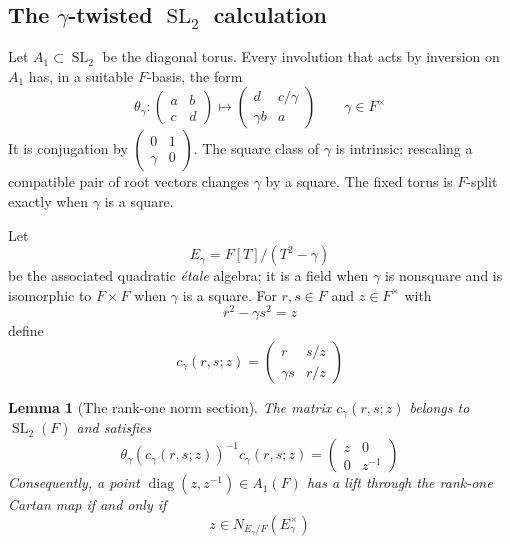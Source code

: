 \documentclass[11pt]{amsart}
\newtheorem{lemma}[lemma]{Lemma}
\theoremstyle{definition}
\theoremstyle{remark}
\newcommand{\diag}{\operatorname{diag}}
\newcommand{\SL}{\operatorname{SL}}
\begin{document}
\subsection{\texorpdfstring{The $\gamma$-twisted $\SL_2$ calculation}{The gamma-twisted SL2 calculation}}
Let $A_1\subset\SL_2$ be the diagonal torus.  Every involution that acts by
inversion on $A_1$ has, in a suitable $F$-basis, the form
\begin{equation}\label{eq:sl2-involution-gamma}
 \theta_\gamma:
 \begin{pmatrix}a&b\\c&d\end{pmatrix}
 \longmapsto
 \begin{pmatrix}d&c/\gamma\\ \gamma b&a\end{pmatrix}
 \qquad \gamma\in F^\times
\end{equation}
It is conjugation by
$\left(\begin{smallmatrix}0&1\\ \gamma&0\end{smallmatrix}\right)$.
The square class of $\gamma$ is intrinsic: rescaling a compatible pair of
root vectors changes $\gamma$ by a square.  The fixed torus is $F$-split
exactly when $\gamma$ is a square.

Let
\[
 E_\gamma=F[T]/(T^2-\gamma)
\]
be the associated quadratic \emph{\'etale} algebra; it is a field when
$\gamma$ is nonsquare and is isomorphic to $F\times F$ when $\gamma$ is a
square.  For $r,s\in F$ and $z\in F^\times$ with
\begin{equation}\label{eq:rank-one-norm}
 r^2-\gamma s^2=z
\end{equation}
define
\begin{equation}\label{eq:gamma-cayley}
 c_\gamma(r,s;z)=
 \begin{pmatrix}
 r&s/z\\
 \gamma s&r/z
 \end{pmatrix}
\end{equation}

\begin{lemma}[The rank-one norm section]\label{lem:sl2-section}
The matrix $c_\gamma(r,s;z)$ belongs to $\SL_2(F)$ and satisfies
\begin{equation}\label{eq:sl2-tau}
 \theta_\gamma(c_\gamma(r,s;z))^{-1}c_\gamma(r,s;z)
 =\begin{pmatrix}z&0\\0&z^{-1}\end{pmatrix}
\end{equation}
Consequently, a point $\diag(z,z^{-1})\in A_1(F)$ has a lift through the
rank-one Cartan map if and only if
\[
 z\in N_{E_\gamma/F}(E_\gamma^\times)
\]
\end{lemma}
\end{document}
